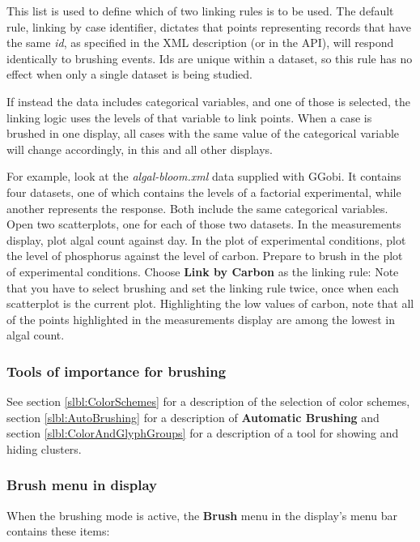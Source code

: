 \documentclass[11pt]{article}
\def\Widget#1{\textbf{#1}}
\def\File#1{\textsl{#1}}
\begin{document}
This list is used to define which of two linking rules is to be used.
The default rule, linking by case identifier, dictates that points
representing records that have the same {\it id}, as specified in the
XML description (or in the API), will respond identically to brushing
events.  Ids are unique within a dataset, so this rule has no effect
when only a single dataset is being studied.

If instead the data includes categorical variables, and one of those
is selected, the linking logic uses the levels of that variable to
link points.  When a case is brushed in one display, all cases
with the same value of the categorical variable will change
accordingly, in this and all other displays.

For example, look at the \File{algal-bloom.xml} data supplied with
GGobi.  It contains four datasets, one of which contains the levels of
a factorial experimental, while another represents the response.  Both
include the same categorical variables.  Open two scatterplots, one
for each of those two datasets.  In the measurements display, plot
algal count against day.  In the plot of experimental conditions, plot
the level of phosphorus against the level of carbon.  Prepare to brush
in the plot of experimental conditions.  Choose \Widget{Link by Carbon}
as the linking rule: Note that you have to select brushing and set the
linking rule twice, once when each scatterplot is the current plot.
Highlighting the low values of carbon, note that all of the points
highlighted in the measurements display are among the lowest in algal
count.

\subsubsection{Tools of importance for brushing}

See section \ref{slbl:ColorSchemes} for a description of the selection
of color schemes, section \ref{slbl:AutoBrushing} for a description of
\Widget{Automatic Brushing} and section \ref{slbl:ColorAndGlyphGroups}
for a description of a tool for showing and hiding clusters.

\subsubsection{Brush menu in display}
%
When the brushing mode is active, the \Widget{Brush} menu in the display's
menu bar contains these items:
\end{document}
